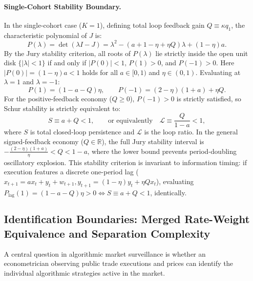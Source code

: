 \documentclass[12pt]{article}
\theoremstyle{definition}
\theoremstyle{remark}
\newcommand{\R}{\mathbb{R}}
\begin{document}
\paragraph{Single-Cohort Stability Boundary.}
In the single-cohort case ($K=1$), defining total loop feedback gain $Q \equiv \kappa q_1$, the characteristic polynomial of $J$ is:
\begin{equation}
P(\lambda) = \det(\lambda I - J) = \lambda^2 - \left( a + 1 - \eta + \eta Q \right) \lambda + (1 - \eta) a.
\label{eq:char_poly}
\end{equation}
By the Jury stability criterion, all roots of $P(\lambda)$ lie strictly inside the open unit disk $\{|\lambda| < 1\}$ if and only if $|P(0)| < 1$, $P(1) > 0$, and $P(-1) > 0$. Here $|P(0)| = (1 - \eta)a < 1$ holds for all $a \in [0, 1)$ and $\eta \in (0, 1)$. Evaluating at $\lambda = 1$ and $\lambda = -1$:
\begin{equation}
P(1) = (1 - a - Q) \eta, \qquad P(-1) = (2 - \eta)(1 + a) + \eta Q.
\end{equation}
For the positive-feedback economy ($Q \ge 0$), $P(-1) > 0$ is strictly satisfied, so Schur stability is strictly equivalent to:
\begin{equation}
S \equiv a + Q < 1, \qquad \text{or equivalently} \quad \mathcal{L} \equiv \frac{Q}{1 - a} < 1,
\label{eq:stability_cond}
\end{equation}
where $S$ is total closed-loop persistence and $\mathcal{L}$ is the loop ratio. In the general signed-feedback economy ($Q \in \R$), the full Jury stability interval is $-\frac{(2-\eta)(1+a)}{\eta} < Q < 1 - a$, where the lower bound prevents period-doubling oscillatory explosion. This stability criterion is invariant to information timing: if execution features a discrete one-period lag ($x_{t+1} = a x_t + y_t + w_{t+1}, y_{t+1} = (1 - \eta) y_t + \eta Q x_t$), evaluating $P_{\text{lag}}(1) = (1 - a - Q)\eta > 0 \iff S \equiv a + Q < 1$, identically.

\subsection{Identification Boundaries: Merged Rate-Weight Equivalence and Separation Complexity}
A central question in algorithmic market surveillance is whether an econometrician observing public trade executions and prices can identify the individual algorithmic strategies active in the market.
\end{document}
